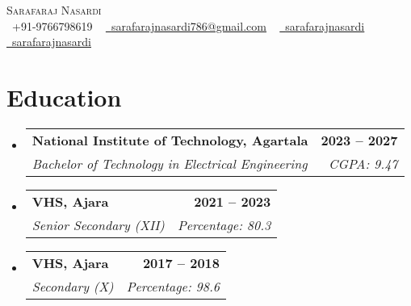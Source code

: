 \documentclass[letterpaper,11pt]{article}
\makeatletter
\newcommand{\resumeSubheading}[4]{
  \vspace{-2pt}\item
    \begin{tabular*}{1.0\textwidth}[t]{l@{\extracolsep{\fill}}r}
      \textbf{#1} & \textbf{\small #2} \\
      \textit{\small#3} & \textit{\small #4} \\
    \end{tabular*}\vspace{-7pt}
}
\newcommand{\resumeSubHeadingListStart}{\begin{itemize}[leftmargin=0.0in, label={}]}
\newcommand{\resumeSubHeadingListEnd}{\end{itemize}}
\makeatother
\begin{document}

\begin{center}
    {\Huge \scshape Sarafaraj Nasardi} \\ \vspace{1pt}
    \vspace{1pt}
    \small \raisebox{-0.1\height}\faPhone\ +91-9766798619 ~ \href{mailto:sarafarajnasardi786@gmail.com}{\raisebox{-0.2\height}\faEnvelope\  \underline{sarafarajnasardi786@gmail.com}} ~ 
    \href{https://www.linkedin.com/in/sarafaraj-nasardi-7722b31b3/}{\raisebox{-0.2\height}\faLinkedin\ \underline{sarafarajnasardi}}  ~
    \href{https://github.com/sarafarajnasard}{\raisebox{-0.2\height}\faGithub\ \underline{sarafarajnasardi}}
    \vspace{-10pt}  
    
\end{center}


\section{Education}
  \resumeSubHeadingListStart
    \resumeSubheading
      {National Institute of Technology, Agartala}{2023 -- 2027}
      {Bachelor of Technology in Electrical Engineering}{CGPA: 9.47}
      \resumeSubheading
      {VHS, Ajara}{2021 -- 2023}
      {Senior Secondary (XII)}{Percentage: 80.3}
      \resumeSubheading
      {VHS, Ajara}{2017 -- 2018}
      {Secondary (X)}{Percentage: 98.6}

  \resumeSubHeadingListEnd

       

\vspace{-10pt}
\end{document}
